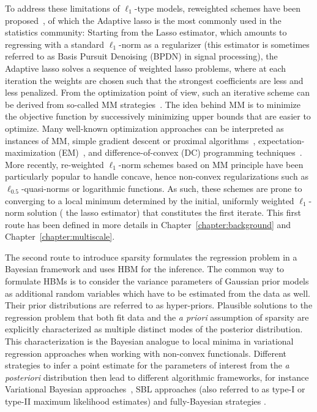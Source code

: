To address these limitations of $\ell_1$-type models, reweighted schemes have been proposed~\cite{Candes,Gasso,Rakotomamonjy,zhang-rao:2011,strohmeier-etal:16}, of which the Adaptive \ac{lasso} \cite{Zou06} is the most commonly used in the statistics community: Starting from the Lasso estimator, which amounts to regressing with a standard $\ell_1$-norm as a regularizer (this estimator is sometimes referred to as Basis Pursuit Denoising (BPDN) \cite{Chen_Donoho_Saunders98} in signal processing), the Adaptive \ac{lasso} solves a sequence of weighted \ac{lasso} problems, where at each iteration the weights are chosen such that the strongest coefficients are less and less penalized.
From the optimization point of view, such an iterative scheme can be derived from so-called \ac{MM} strategies~\cite{lange2000optimization,schifano2010majorization}.
The idea behind MM is to minimize the objective function by successively minimizing upper bounds that are easier to optimize. Many well-known optimization approaches can be interpreted as instances of MM, \textit{\eg} simple gradient descent or proximal algorithms~\cite{Combettes2011}, expectation-maximization (EM)~\cite{Dempster77maximumlikelihood}, and difference-of-convex (DC) programming techniques~\cite{Horst:1999}.
%
More recently, re-weighted $\ell_1$-norm schemes based on \ac{MM} principle have been particularly popular to handle concave, hence non-convex regularizations such as $\ell_{0.5}$-quasi-norms or logarithmic functions. As such, these schemes are prone to converging to a local minimum determined by the initial, uniformly weighted $\ell_1$-norm solution (\textit{\ie} the \ac{lasso} estimator) that constitutes the first iterate. This first route has been defined in more details in Chapter~\ref{chapter:background} and Chapter~\ref{chapter:multiscale}.

The second route to introduce sparsity formulates the regression problem in a Bayesian framework and uses \ac{HBM} \cite{mackay2003information} for the inference.
The common way to formulate HBMs is to consider the variance parameters of Gaussian prior models as additional random variables which have to be estimated from the data as well. Their prior distributions are referred to as hyper-priors. Plausible solutions to the regression problem that both fit data and the \emph{a priori} assumption of sparsity are explicitly characterized as multiple distinct modes of the posterior distribution. This characterization is the Bayesian analogue to local minima in variational regression approaches when working with non-convex functionals. Different strategies to infer a point estimate for the parameters of interest from the \emph{a posteriori} distribution then lead to different algorithmic frameworks, for instance Variational Bayesian approaches~\cite{mackay2003information,jordan1999introduction,sato2004hierarchical,FrHaDaKiPhTrHeFlMa08,shervashidze2015learning}, \ac{SBL} approaches (also referred to as type-I or type-II maximum likelihood estimates) \cite{tipping2001sparse,wipf2004sparse,Wipf-Nagarajan:2009,zhang-rao:2011} and fully-Bayesian strategies \cite{CaHaPuSo09,Lucka-etal:2012}.

